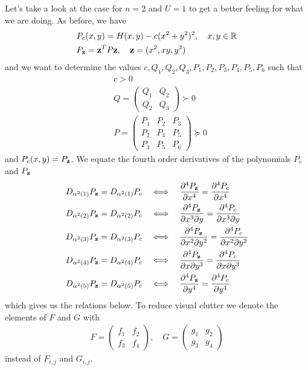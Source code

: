 \documentclass[a4paper,12pt,twoside,BCOR=10mm]{scrbook}
\begin{document}
Let's take a look at the case for $n = 2$ and $U = 1$ to get a better feeling for what we are doing. As before, we have
\begin{align*}
    &P_c(x, y) = H(x,y) - c(x^2 + y^2)^2, \quad x,y\in\mathbb{R}^{}\\
    &P_{\mathbf{z}} = \mathbf{z}^T P \mathbf{z}, \quad \mathbf{z} = (x^2, xy, y^2)
\end{align*}
and we want to determine the values $c, Q_1, Q_2,Q_3, P_1, P_2, P_3, P_4, P_5, P_6$ such that
\begin{align*}
    &c > 0\\
    &Q = \begin{pmatrix}
    Q_1 & Q_2\\
    Q_2 & Q_3
    \end{pmatrix}
    \succ 0\\
    &P = \begin{pmatrix}
    P_1 & P_2 & P_3\\
    P_2 & P_4 & P_5\\
    P_3 & P_5 & P_6
    \end{pmatrix}
    \succeq 0
\end{align*}
and $P_c(x ,y) = P_{\mathbf{z}}$. We equate the fourth order derivatives of the polynomials $P_c$ and $P_{\mathbf{z}}$
\begin{align*}
    &D_{\alpha^2(1)} P_{\mathbf{z}} = D_{\alpha^2(1)} P_c \quad \Longleftrightarrow \quad \frac{\partial^4 P_{\mathbf{z}}}{\partial x^4} = \frac{\partial^4 P_c}{\partial x^4} \nonumber\\
    &D_{\alpha^2(2)} P_{\mathbf{z}} = D_{\alpha^2(2)} P_c \quad \Longleftrightarrow \quad \frac{\partial^4 P_{\mathbf{z}}}{\partial x^3 \partial y} = \frac{\partial^4 P_c}{\partial x^3 \partial y}\nonumber\\
    &D_{\alpha^2(3)} P_{\mathbf{z}} = D_{\alpha^2(3)} P_c \quad \Longleftrightarrow \quad \frac{\partial^4 P_{\mathbf{z}}}{\partial x^2 \partial y^2} = \frac{\partial^4 P_c}{\partial x^2 \partial y^2}\\
    &D_{\alpha^2(4)} P_{\mathbf{z}} = D_{\alpha^2(4)} P_c \quad \Longleftrightarrow \quad \frac{\partial^4 P_{\mathbf{z}}}{\partial x \partial y^3} = \frac{\partial^4 P_c}{\partial x \partial y^3}\nonumber\\
    &D_{\alpha^2(5)} P_{\mathbf{z}} = D_{\alpha^2(5)} P_c \quad \Longleftrightarrow \quad \frac{\partial^4 P_{\mathbf{z}}}{\partial y^4} = \frac{\partial^4 P_c}{\partial y^4}\nonumber
\end{align*}
which gives us the relations below. To reduce visual clutter we denote the elements of $F$ and $G$ with
\begin{align*}
    F = \begin{pmatrix}
    f_1 & f_2\\
    f_3 & f_4
    \end{pmatrix}
    , \quad
    G = \begin{pmatrix}
    g_1 & g_2\\
    g_3 & g_4
    \end{pmatrix}
\end{align*}
instead of $F_{i,j}$ and $G_{i,j}$.
\end{document}
